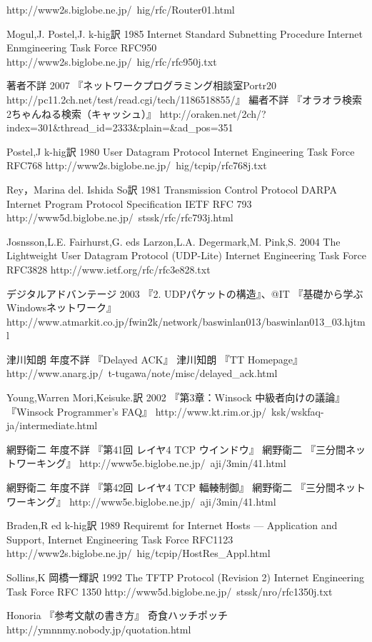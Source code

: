 \begin{thebibliography}{99}
     http://www2s.biglobe.ne.jp/~hig/rfc/Router01.html
\item
      Mogul,J. Postel,J.
	k-hig訳 
	1985
	Internet Standard Subnetting Procedure Internet Enmgineering Task Force RFC950
	http://www2s.biglobe.ne.jp/~hig/rfc/rfc950j.txt
\item
    著者不詳
	2007
	『ネットワークプログラミング相談室Portr20 http://pc11.2ch.net/test/read.cgi/tech/1186518855/』 
	編者不詳 
	『オラオラ検索 2ちゃんねる検索（キャッシュ）』
    http://oraken.net/2ch/?index=301\&thread\_id=2333\&plain=\&ad\_pos=351
\item
    Postel,J
	k-hig訳
	1980
	User Datagram Protocol Internet Engineering Task Force RFC768
     http://www2s.biglobe.ne.jp/~hig/tcpip/rfc768j.txt
\item
      Rey，Marina del.
	Ishida So訳
	1981
	Transmission Control Protocol DARPA Internet Program Protocol Specification IETF RFC 793
     http://www5d.biglobe.ne.jp/~stssk/rfc/rfc793j.html
\item
     Josnsson,L.E. Fairhurst,G. eds Larzon,L.A. Degermark,M. Pink,S.
	2004
	The Lightweight User Datagram Protocol (UDP-Lite) Internet Engineering Task Force RFC3828
     http://www.ietf.org/rfc/rfc3e828.txt
\item
     デジタルアドバンテージ
	2003
	『2. UDPパケットの構造』、@IT 『基礎から学ぶWindowsネットワーク』
     http://www.atmarkit.co.jp/fwin2k/network/baswinlan013/baswinlan013\_03.hjtml
\item
     津川知朗
	年度不詳 
	『Delayed ACK』
	津川知朗
	『TT Homepage』
     http://www.anarg.jp/~t-tugawa/note/misc/delayed\_ack.html
\item
      Young,Warren
	Mori,Keisuke.訳
	2002
	『第3章：Winsock 中級者向けの議論』 
	『Winsock Programmer's FAQ』
     http://www.kt.rim.or.jp/~ksk/wskfaq-ja/intermediate.html
\item
      網野衛二
	年度不詳
	『第41回 レイヤ4 TCP ウインドウ』
	網野衛二
	『三分間ネットワーキング』
     http://www5e.biglobe.ne.jp/~aji/3min/41.html
\item
      網野衛二
	年度不詳
	『第42回 レイヤ4 TCP 輻輳制御』
	網野衛二
	『三分間ネットワーキング』
     http://www5e.biglobe.ne.jp/~aji/3min/41.html

\item
      Braden,R ed
	k-hig訳
	1989
	Requiremt for Internet Hosts --- Application and Support, Internet Engineering Task Force RFC1123
      http://www2s.biglobe.ne.jp/~hig/tcpip/HostRes\_Appl.html
\item
      Sollins,K
	岡橋一輝訳
	1992
	The TFTP Protocol (Revision 2) Internet Engineering Task Force RFC 1350
     http://www5d.biglobe.ne.jp/~stssk/nro/rfc1350j.txt
\item
	Honoria
	『参考文献の書き方』
	奇食ハッチポッチ
	http://ymnnmy.nobody.jp/quotation.html


\end{thebibliography}
